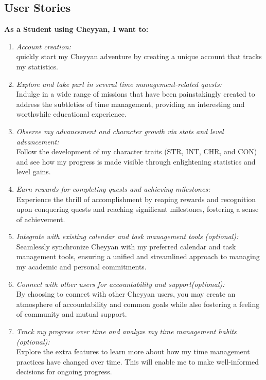 \documentclass{l4proj}
\begin{document}
\subsection{User Stories}
\textbf{As a Student using Cheyyan, I want to:}

\begin{enumerate}
    \item \textit{Account creation:}  \\
        quickly start my Cheyyan adventure by creating a unique account that tracks my statistics.
  
  \item \textit{Explore and take part in several time management-related quests:} \\
        Indulge in a wide range of missions that have been painstakingly created to address the subtleties of time management, providing an interesting and worthwhile educational experience.
  
  \item \textit{Observe my advancement and character growth via stats and level advancement:} \\
        Follow the development of my character traits (STR, INT, CHR, and CON) and see how my progress is made visible through enlightening statistics and level gains.
  
  \item \textit{Earn rewards for completing quests and achieving milestones:} \\
        Experience the thrill of accomplishment by reaping rewards and recognition upon conquering quests and reaching significant milestones, fostering a sense of achievement.
  
  \item \textit{Integrate with existing calendar and task management tools (optional):} \\
        Seamlessly synchronize Cheyyan with my preferred calendar and task management tools, ensuring a unified and streamlined approach to managing my academic and personal commitments.
  
  \item \textit{Connect with other users  for accountability and support(optional):} \\
        By choosing to connect with other Cheyyan users, you may create an atmosphere of accountability and common goals while also fostering a feeling of community and mutual support.
  
  \item \textit{Track my progress over time and analyze my time management habits (optional):} \\
        Explore the extra features to learn more about how my time management practices have changed over time. This will enable me to make well-informed decisions for ongoing progress.
\end{enumerate}
\end{document}
